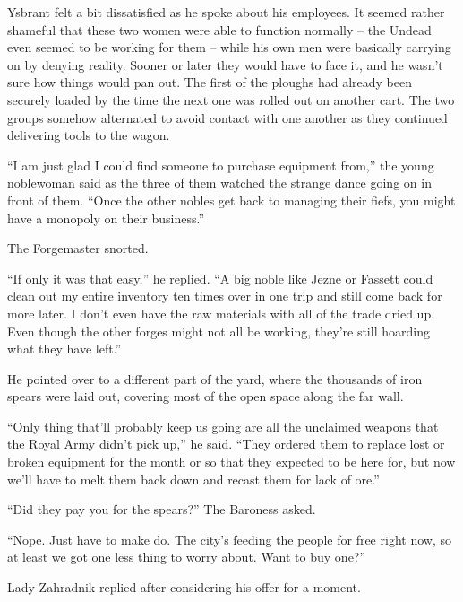  

Ysbrant felt a bit dissatisfied as he spoke about his employees. It seemed rather shameful that these two women were able to function normally – the Undead even seemed to be working for them – while his own men were basically carrying on by denying reality. Sooner or later they would have to face it, and he wasn’t sure how things would pan out. The first of the ploughs had already been securely loaded by the time the next one was rolled out on another cart. The two groups somehow alternated to avoid contact with one another as they continued delivering tools to the wagon.

 

“I am just glad I could find someone to purchase equipment from,” the young noblewoman said as the three of them watched the strange dance going on in front of them. “Once the other nobles get back to managing their fiefs, you might have a monopoly on their business.”

 

The Forgemaster snorted.

 

“If only it was that easy,” he replied. “A big noble like Jezne or Fassett could clean out my entire inventory ten times over in one trip and still come back for more later. I don’t even have the raw materials with all of the trade dried up. Even though the other forges might not all be working, they’re still hoarding what they have left.”

 

He pointed over to a different part of the yard, where the thousands of iron spears were laid out, covering most of the open space along the far wall.

 

“Only thing that’ll probably keep us going are all the unclaimed weapons that the Royal Army didn’t pick up,” he said. “They ordered them to replace lost or broken equipment for the month or so that they expected to be here for, but now we’ll have to melt them back down and recast them for lack of ore.”

 

“Did they pay you for the spears?” The Baroness asked.

 

“Nope. Just have to make do. The city’s feeding the people for free right now, so at least we got one less thing to worry about. Want to buy one?”

 

Lady Zahradnik replied after considering his offer for a moment.

